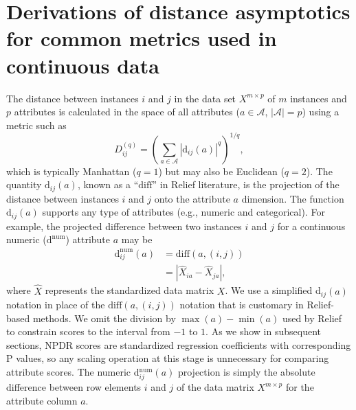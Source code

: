 \documentclass[10pt,letterpaper]{article}\usepackage[]{graphicx}\usepackage[]{color}
\def\ri{R_i}
\def\rj{R_j}
\begin{document}
\section{Derivations of distance asymptotics for common metrics used in continuous data}
The distance between instances $i$ and $j$ in the data set $X^{m \times p}$ of $m$ instances and $p$ attributes is calculated in the space of all attributes ($a \in \mathcal{A}$, $|\mathcal{A}|=p$) using a metric such as
\begin{equation}\label{eq:D}
D^{(q)}_{ij}=\left(\sum_{a\in \mathcal{A}}|\text{d}_{ij}(a)|^q\right)^{1/q},
\end{equation}
which is typically Manhattan ($q=1$) but may also be Euclidean ($q=2$). The quantity 
$\text{d}_{ij}(a)$,
known as a ``$\text{diff}$'' in Relief literature, is the projection of the distance between instances $i$ and $j$ onto the attribute $a$ dimension. The 
function $\text{d}_{ij}(a)$ supports any type of attributes
(e.g., numeric and categorical).
For example, the projected difference between two instances $i$ and $j$ for a continuous numeric ($\text{d}^{\text{num}}$) attribute $a$ may be
\begin{equation}\label{eq:diff}
\begin{aligned}
\text{d}^{\text{num}}_{ij}(a)&=\text{diff}(a,(i,j))\\
                                            & = {|\hat{X}_{ia}-\hat{X}_{ja}|},
\end{aligned}
\end{equation}
where $\hat{X}$ represents the standardized data matrix $X$.
We use a simplified d$_{ij}(a)$ notation in place of the $\text{diff}(a,(i,j))$ notation that is customary in Relief-based methods.
We omit the division by $\max(a)-\min(a)$ used by Relief to constrain scores to the interval from $-1$ to $1$.
As we show in subsequent sections, NPDR scores are standardized regression coefficients with corresponding P values, so any scaling operation at this stage is unnecessary for comparing attribute scores. 
The numeric d$^{\text{num}}_{ij}(a)$ projection is simply the absolute difference between row elements $i$ and $j$ of the data matrix $X^{m \times p}$ for the attribute column $a$. 
\end{document}
